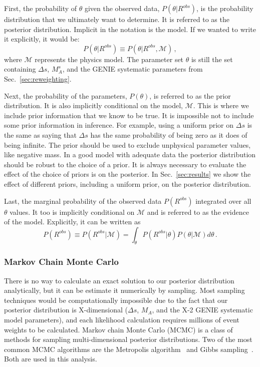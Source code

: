     
    First, the probability of $\theta$ given the observed data,
    $P(\theta|R^{obs})$, is the probability distribution that we ultimately
    want to determine. It is referred to as the posterior distribution.
    Implicit in the notation is the model. If we wanted to write it explicitly,
    it would be:
    \begin{equation*}
      P(\theta|R^{obs})\equiv P(\theta|R^{obs},\mathcal{M}) \,,
    \end{equation*}
    where $\mathcal{M}$ represents the physics model. The parameter set
    $\theta$ is still the set containing $\Delta s$, $M_A^s$, and the GENIE
    systematic parameters from Sec.~\ref{sec:reweighting}.

    Next, the probability of the parameters, $P(\theta)$, is referred to as the
    prior distribution. It is also implicitly conditional on the model,
    $\mathcal{M}$. This is where we include prior information that we know to
    be true. It is impossible not to include some prior information in
    inference. For example, using a uniform prior on $\Delta s$ is the same as
    saying that $\Delta s$ has the same probability of being zero as it does of
    being infinite. The prior should be used to exclude unphysical parameter
    values, like negative mass. In a good model with adequate data the
    posterior distribution should be robust to the choice of a prior. It is
    always necessary to evaluate the effect of the choice of priors is on the
    posterior. In Sec.~\ref{sec:results} we show the effect of different
    priors, including a uniform prior, on the posterior distribution.

    Last, the marginal probability of the observed data $P(R^{obs})$ integrated
    over all $\theta$ values.  It too is implicitly conditional on
    $\mathcal{M}$ and is referred to as the evidence of the model. Explicitly,
    it can be written as
    \begin{equation*}
      P(R^{obs}) \equiv P(R^{obs}|\mathcal{M}) 
          = \int_{\theta}P(R^{obs}|\theta)P(\theta|\mathcal{M})d\theta \,.
    \end{equation*}

  \subsubsection{Markov Chain Monte Carlo}
    There is no way to calculate an exact solution to our posterior
    distribution analytically, but it can be estimate it numerically by
    sampling. Most sampling techniques would be computationally impossible due
    to the fact that our posterior distribution is X-dimensional ($\Delta s$,
    $M_A$, and the X-2 GENIE systematic model parameters), and each likelihood
    calculation requires millions of event weights to be calculated. Markov
    chain Monte Carlo (MCMC) is a class of methods for sampling
    multi-dimensional posterior distributions. Two of the most common MCMC
    algorithms are the Metropolis algorithm~\cite{Metropolis} and Gibbs
    sampling~\cite{Gibbs}. Both are used in this analysis.

